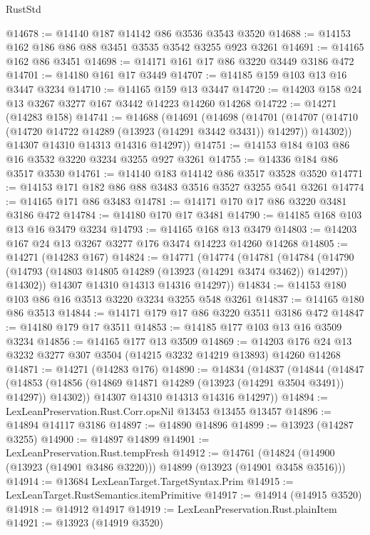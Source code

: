 \begin{lexlean}{RustStd}
\begin{coremodule}
@14678 := @14140 @187 @14142 @86 @3536 @3543 @3520
@14688 := @14153 @162 @186 @86 @88 @3451 @3535 @3542 @3255 @923 @3261
@14691 := @14165 @162 @86 @3451
@14698 := @14171 @161 @17 @86 @3220 @3449 @3186 @472
@14701 := @14180 @161 @17 @3449
@14707 := @14185 @159 @103 @13 @16 @3447 @3234
@14710 := @14165 @159 @13 @3447
@14720 := @14203 @158 @24 @13 @3267 @3277 @167 @3442 @14223 @14260 @14268
@14722 := @14271 (@14283 @158)
@14741 := @14688
    (@14691
      (@14698
        (@14701
          (@14707 (@14710 (@14720 @14722 @14289 (@13923 (@14291 @3442 @3431)) @14297)) @14302))
        @14307
        @14310
        @14313
        @14316
        @14297))
@14751 := @14153 @184 @103 @86 @16 @3532 @3220 @3234 @3255 @927 @3261
@14755 := @14336 @184 @86 @3517 @3530
@14761 := @14140 @183 @14142 @86 @3517 @3528 @3520
@14771 := @14153 @171 @182 @86 @88 @3483 @3516 @3527 @3255 @541 @3261
@14774 := @14165 @171 @86 @3483
@14781 := @14171 @170 @17 @86 @3220 @3481 @3186 @472
@14784 := @14180 @170 @17 @3481
@14790 := @14185 @168 @103 @13 @16 @3479 @3234
@14793 := @14165 @168 @13 @3479
@14803 := @14203 @167 @24 @13 @3267 @3277 @176 @3474 @14223 @14260 @14268
@14805 := @14271 (@14283 @167)
@14824 := @14771
    (@14774
      (@14781
        (@14784
          (@14790 (@14793 (@14803 @14805 @14289 (@13923 (@14291 @3474 @3462)) @14297)) @14302))
        @14307
        @14310
        @14313
        @14316
        @14297))
@14834 := @14153 @180 @103 @86 @16 @3513 @3220 @3234 @3255 @548 @3261
@14837 := @14165 @180 @86 @3513
@14844 := @14171 @179 @17 @86 @3220 @3511 @3186 @472
@14847 := @14180 @179 @17 @3511
@14853 := @14185 @177 @103 @13 @16 @3509 @3234
@14856 := @14165 @177 @13 @3509
@14869 := @14203 @176 @24 @13 @3232 @3277 @307 @3504 (@14215 @3232 @14219 @13893) @14260 @14268
@14871 := @14271 (@14283 @176)
@14890 := @14834
    (@14837
      (@14844
        (@14847
          (@14853 (@14856 (@14869 @14871 @14289 (@13923 (@14291 @3504 @3491)) @14297)) @14302))
        @14307
        @14310
        @14313
        @14316
        @14297))
@14894 := LexLeanPreservation.Rust.Corr.opsNil @13453 @13455 @13457
@14896 := @14894 @14117 @3186
@14897 := @14890 @14896
@14899 := @13923 (@14287 @3255)
@14900 := @14897 @14899
@14901 := LexLeanPreservation.Rust.tempFresh
@14912 := @14761
    (@14824 (@14900 (@13923 (@14901 @3486 @3220))) @14899 (@13923 (@14901 @3458 @3516)))
@14914 := @13684 LexLeanTarget.TargetSyntax.Prim
@14915 := LexLeanTarget.RustSemantics.itemPrimitive
@14917 := @14914 (@14915 @3520)
@14918 := @14912 @14917
@14919 := LexLeanPreservation.Rust.plainItem
@14921 := @13923 (@14919 @3520)

\end{coremodule}
\end{lexlean}
